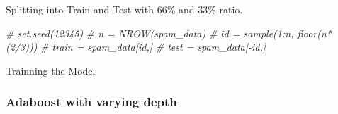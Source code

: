 \documentclass[]{article}
\newenvironment{Shaded}{\begin{snugshade}}{\end{snugshade}}
\newcommand{\CommentTok}[1]{\textcolor[rgb]{0.56,0.35,0.01}{\textit{#1}}}
\begin{document}
Splitting into Train and Test with 66\% and 33\% ratio.

\begin{Shaded}
\begin{Highlighting}[]
\CommentTok{# set.seed(12345)}
\CommentTok{# n =  NROW(spam_data)}
\CommentTok{# id = sample(1:n, floor(n*(2/3)))}
\CommentTok{# train = spam_data[id,]}
\CommentTok{# test = spam_data[-id,]}
\end{Highlighting}
\end{Shaded}

Trainning the Model

\subsubsection{Adaboost with varying
depth}\label{adaboost-with-varying-depth}
\end{document}
